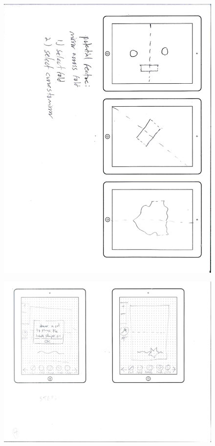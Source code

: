\begin{figure}[htbp]
\centering
\includegraphics{figures/90_Appendix_UI_Mockups/007.png}
\caption{}
\end{figure}

\begin{figure}[htbp]
\centering
\includegraphics{figures/90_Appendix_UI_Mockups/008.png}
\caption{}
\end{figure}

